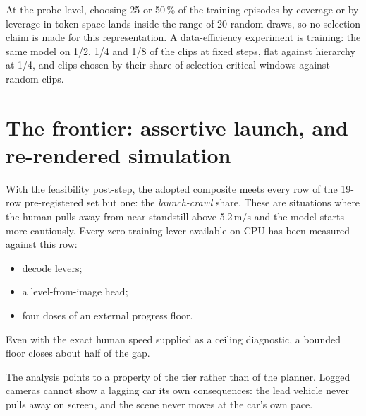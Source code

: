 \documentclass[10pt,twocolumn]{article}
\makeatletter
\theoremstyle{remark}
\renewcommand\paragraph{\@startsection{paragraph}{4}{\z@}{1.6ex \@plus .5ex \@minus .2ex}{-1em}{\normalfont\normalsize\bfseries}}
\makeatother
\begin{document}
\paragraph{Data (T8).} At the probe level, choosing 25 or 50\,\% of the training episodes by coverage or by leverage in token space
lands inside the range of 20 random draws, so no selection claim is made for this representation. A data-efficiency experiment is
training: the same model on 1/2, 1/4 and 1/8 of the clips at fixed steps, flat against hierarchy at 1/4, and clips chosen by their
share of selection-critical windows against random clips.

\section{The frontier: assertive launch, and re-rendered simulation}\label{sec:frontier}
With the feasibility post-step, the adopted composite meets every row of the 19-row pre-registered set but one: the \emph{launch-crawl}
share. These are situations where the human pulls away from near-standstill above 5.2\,m/s and the model starts more cautiously.
Every zero-training lever available on CPU has been measured against this row:
\begin{itemize}
  \item decode levers;
  \item a level-from-image head;
  \item four doses of an external progress floor.
\end{itemize}
Even with the exact human speed supplied as a ceiling diagnostic, a bounded floor closes about half of the gap.

The analysis points to a property of the tier rather than of the planner. Logged cameras cannot show a lagging car its own
consequences: the lead vehicle never pulls away on screen, and the scene never moves at the car's own pace.
\end{document}
